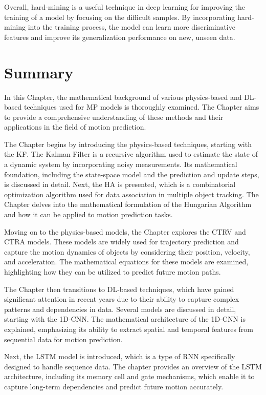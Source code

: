 Overall, hard-mining is a useful technique in deep learning for improving the training of a model by focusing on the difficult samples. By incorporating hard-mining into the training process, the model can learn more discriminative features and improve its generalization performance on new, unseen data.

\section{Summary}
\label{sec:3_summary}

In this Chapter, the mathematical background of various physics-based and \ac{DL}-based techniques used for \ac{MP} models is thoroughly examined. The Chapter aims to provide a comprehensive understanding of these methods and their applications in the field of motion prediction.

The Chapter begins by introducing the physics-based techniques, starting with the \ac{KF}. The Kalman Filter is a recursive algorithm used to estimate the state of a dynamic system by incorporating noisy measurements. Its mathematical foundation, including the state-space model and the prediction and update steps, is discussed in detail. Next, the \ac{HA} is presented, which is a combinatorial optimization algorithm used for data association in multiple object tracking. The Chapter delves into the mathematical formulation of the Hungarian Algorithm and how it can be applied to motion prediction tasks.

Moving on to the physics-based models, the Chapter explores the \ac{CTRV} and \ac{CTRA} models. These models are widely used for trajectory prediction and capture the motion dynamics of objects by considering their position, velocity, and acceleration. The mathematical equations for these models are examined, highlighting how they can be utilized to predict future motion paths.

The Chapter then transitions to \ac{DL}-based techniques, which have gained significant attention in recent years due to their ability to capture complex patterns and dependencies in data. Several models are discussed in detail, starting with the 1D-\ac{CNN}. The mathematical architecture of the 1D-\ac{CNN} is explained, emphasizing its ability to extract spatial and temporal features from sequential data for motion prediction.

Next, the \ac{LSTM} model is introduced, which is a type of \ac{RNN} specifically designed to handle sequence data. The chapter provides an overview of the \ac{LSTM} architecture, including its memory cell and gate mechanisms, which enable it to capture long-term dependencies and predict future motion accurately.

